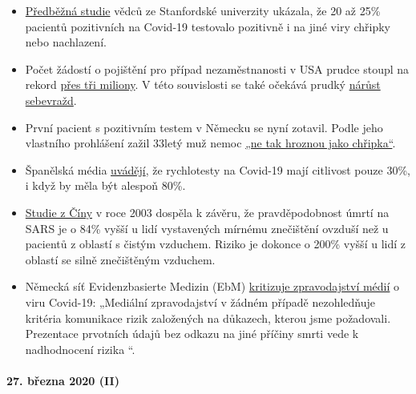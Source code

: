 \begin{itemize}
\tightlist
\item
  \href{https://medium.com/@nigam/higher-co-infection-rates-in-covid19-b24965088333}{Předběžná
  studie} vědců ze Stanfordské univerzity ukázala, že 20 až 25\%
  pacientů pozitivních na Covid-19 testovalo pozitivně i na jiné viry
  chřipky nebo nachlazení.
\item
  Počet žádostí o pojištění pro případ nezaměstnanosti v USA prudce
  stoupl na rekord
  \href{https://www.businessinsider.com/us-weekly-jobless-claims-record-coronavirus-unemployment-insurance-labor-recession-2020-3}{přes
  tři miliony}. V této souvislosti se také očekává prudký
  \href{https://twitter.com/KoenSwinkels/status/1243066532390977544}{nárůst
  sebevražd}.
\item
  První pacient s pozitivním testem v Německu se nyní zotavil. Podle
  jeho vlastního prohlášení zažil 33letý muž nemoc
  \href{https://www.br.de/nachrichten/bayern/coronavirus-patient-nummer-1-wie-ich-die-quarantaene-erlebte,Rrm4Ul8}{„ne
  tak hroznou jako chřipka``}.
\item
  Španělská média
  \href{https://elpais.com/sociedad/2020-03-25/los-test-rapidos-de-coronavirus-comprados-en-china-no-funcionan.html}{uvádějí},
  že rychlotesty na Covid-19 mají citlivost pouze 30\%, i když by měla
  být alespoň 80\%.
\item
  \href{https://ehjournal.biomedcentral.com/articles/10.1186/1476-069X-2-15}{Studie
  z Číny} v roce 2003 dospěla k závěru, že pravděpodobnost úmrtí na SARS
  je o 84\% vyšší u lidí vystavených mírnému znečištění ovzduší než u
  pacientů z oblastí s čistým vzduchem. Riziko je dokonce o 200\% vyšší
  u lidí z oblastí se silně znečištěným vzduchem.
\item
  Německá síť Evidenzbasierte Medizin (EbM)
  \href{https://www.ebm-netzwerk.de/en/publications/covid-19}{kritizuje
  zpravodajství médií} o viru Covid-19: „Mediální zpravodajství v žádném
  případě nezohledňuje kritéria komunikace rizik založených na důkazech,
  kterou jsme požadovali. Prezentace prvotních údajů bez odkazu na jiné
  příčiny smrti vede k nadhodnocení rizika ``.
\end{itemize}

\hypertarget{27-bux159ezna-2020-ii}{%
\paragraph{27. března 2020 (II)}\label{27-bux159ezna-2020-ii}}

